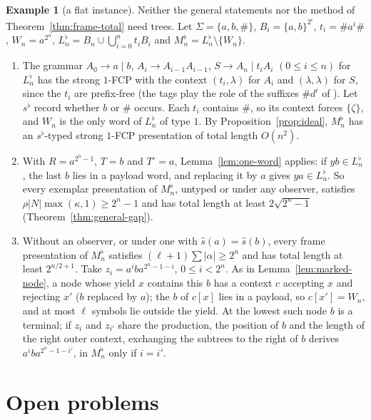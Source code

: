 \documentclass[11pt]{article}
\numberwithin{equation}{section}
\theoremstyle{plain}
\theoremstyle{definition}
\newtheorem{example}[theorem]{Example}
\theoremstyle{remark}
\theoremstyle{plain}
\newcommand{\eps}{\lambda}
\begin{document}
\begin{example}[a flat instance]\label{ex:flat}
Neither the general statements nor the method of
Theorem~\ref{thm:frame-total} need trees.  Let $\Sigma=\{a,b,\#\}$,
$B_i=\{a,b\}^{2^i}$, $t_i=\#a^i\#$, $W_n=a^{2^n}$,
$L^\flat_n=B_n\cup\bigcup_{i=0}^nt_iB_i$ and $M^\flat_n=L^\flat_n\setminus\{W_n\}$.
\begin{enumerate}[label=\textup{(\roman*)},nosep]
\item The grammar $A_0\to a\mid b$, $A_i\to A_{i-1}A_{i-1}$, $S\to A_n\mid
t_iA_i$ $(0\le i\le n)$ for $L^\flat_n$ has the strong $1$-FCP with the context
$(t_i,\eps)$ for $A_i$ and $(\eps,\eps)$ for $S$, since the $t_i$ are
prefix-free (the tags play the role of the suffixes $\#d^i$ of
\citealp[Thm.~5]{ky2021}).  Let $s^\flat$ record whether $b$ or $\#$ occurs.  Each $t_i$
contains $\#$, so its context forces $\{\zeta\}$, and $W_n$ is the only word
of $L^\flat_n$ of type $1$.  By Proposition~\ref{prop:ideal}, $M^\flat_n$ has an
$s^\flat$-typed strong $1$-FCP presentation of total length $O(n^2)$.
\item With $R=a^{2^n-1}$, $T=b$ and $T^\circ=a$, Lemma~\ref{lem:one-word}
applies: if $yb\in L^\flat_n$, the last $b$ lies in a payload word, and
replacing it by $a$ gives $ya\in L^\flat_n$.  So every exemplar presentation
of $M^\flat_n$, untyped or under any observer, satisfies
$\rho|N|\max(\kappa,1)\ge2^n-1$ and has total length at least
$2\sqrt{2^n-1}$ (Theorem~\ref{thm:general-gap}).
\item Without an observer, or under one with $\widehat s(a)=\widehat s(b)$,
every frame presentation of $M^\flat_n$ satisfies $(\ell+1)\sum|\alpha|\ge2^n$
and has total length at least $2^{n/2+1}$.  Take $z_i=a^iba^{2^n-1-i}$,
$0\le i<2^n$.  As in Lemma~\ref{lem:marked-node}, a node whose yield $x$
contains this $b$ has a context $c$ accepting $x$ and rejecting $x'$ ($b$
replaced by $a$); the $b$ of $c[x]$ lies in a payload, so $c[x']=W_n$, and at
most $\ell$ symbols lie outside the yield.  At the lowest such node $b$ is a
terminal; if $z_i$ and $z_{i'}$ share the production, the position of $b$ and
the length of the right outer context, exchanging the subtrees to the right
of $b$ derives $a^iba^{2^n-1-i'}$, in $M^\flat_n$ only if $i=i'$.
\end{enumerate}
\end{example}

\section{Open problems}\label{sec:open}
\end{document}
